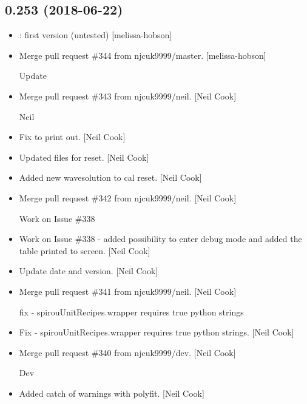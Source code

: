 \documentclass[a4paper,10pt,english]{report}
\begin{document}
\subsection{0.253 (2018-06-22)}
\label{\detokenize{misc/changelog:id412}}\begin{itemize}
\item {} 
: first version (untested) {[}melissa-hobson{]}

\item {} 
Merge pull request \#344 from njcuk9999/master. {[}melissa-hobson{]}

Update

\item {} 
Merge pull request \#343 from njcuk9999/neil. {[}Neil Cook{]}

Neil

\item {} 
Fix to print out. {[}Neil Cook{]}

\item {} 
Updated files for reset. {[}Neil Cook{]}

\item {} 
Added new wavesolution to cal reset. {[}Neil Cook{]}

\item {} 
Merge pull request \#342 from njcuk9999/neil. {[}Neil Cook{]}

Work on Issue \#338

\item {} 
Work on Issue \#338 - added possibility to enter debug mode and added
the table printed to screen. {[}Neil Cook{]}

\item {} 
Update date and version. {[}Neil Cook{]}

\item {} 
Merge pull request \#341 from njcuk9999/neil. {[}Neil Cook{]}

fix - spirouUnitRecipes.wrapper requires true python strings

\item {} 
Fix - spirouUnitRecipes.wrapper requires true python strings. {[}Neil
Cook{]}

\item {} 
Merge pull request \#340 from njcuk9999/dev. {[}Neil Cook{]}

Dev

\item {} 
Added catch of warnings with polyfit. {[}Neil Cook{]}


\end{itemize}
\end{document}
